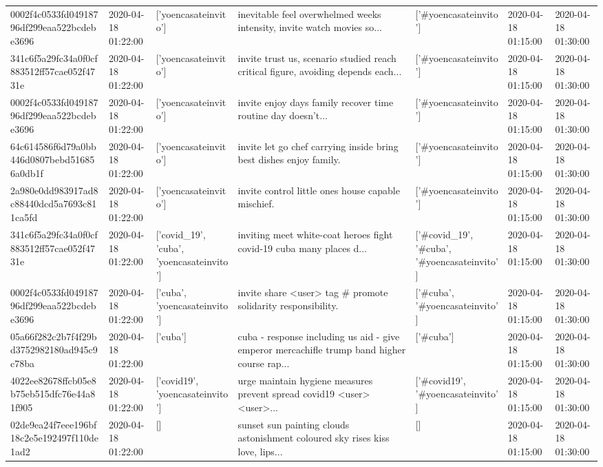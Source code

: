 \begin{tabular}{lllllll}
0002f4c0533fd04918796df299eaa522bcdebe3696 & 2020-04-18 01:22:00 & ['yoencasateinvito'] & inevitable feel overwhelmed weeks intensity, invite watch movies so... & ['#yoencasateinvito'] & 2020-04-18 01:15:00 & 2020-04-18 01:30:00 \\
341c6f5a29fc34a0f0cf883512ff57cae052f4731e & 2020-04-18 01:22:00 & ['yoencasateinvito'] & invite trust us, scenario studied reach critical figure, avoiding depends each... & ['#yoencasateinvito'] & 2020-04-18 01:15:00 & 2020-04-18 01:30:00 \\
0002f4c0533fd04918796df299eaa522bcdebe3696 & 2020-04-18 01:22:00 & ['yoencasateinvito'] & invite enjoy days family recover time routine day doesn't... & ['#yoencasateinvito'] & 2020-04-18 01:15:00 & 2020-04-18 01:30:00 \\
64c614586f6d79a0bb446d0807bebd516856a0db1f & 2020-04-18 01:22:00 & ['yoencasateinvito'] & invite let go chef carrying inside bring best dishes enjoy family. & ['#yoencasateinvito'] & 2020-04-18 01:15:00 & 2020-04-18 01:30:00 \\
2a980e0dd983917ad8c88440dcd5a7693c811ca5fd & 2020-04-18 01:22:00 & ['yoencasateinvito'] & invite control little ones house capable mischief. & ['#yoencasateinvito'] & 2020-04-18 01:15:00 & 2020-04-18 01:30:00 \\
341c6f5a29fc34a0f0cf883512ff57cae052f4731e & 2020-04-18 01:22:00 & ['covid_19', 'cuba', 'yoencasateinvito'] & inviting meet white-coat heroes fight covid-19 cuba many places d... & ['#covid_19', '#cuba', '#yoencasateinvito'] & 2020-04-18 01:15:00 & 2020-04-18 01:30:00 \\
0002f4c0533fd04918796df299eaa522bcdebe3696 & 2020-04-18 01:22:00 & ['cuba', 'yoencasateinvito'] & invite share <user> tag \# promote solidarity responsibility. & ['#cuba', '#yoencasateinvito'] & 2020-04-18 01:15:00 & 2020-04-18 01:30:00 \\
05a66f282c2b7f4f29bd3752982180ad945c9c78ba & 2020-04-18 01:22:00 & ['cuba'] & cuba - response including us aid - give emperor mercachifle trump band higher course rap... & ['#cuba'] & 2020-04-18 01:15:00 & 2020-04-18 01:30:00 \\
4022ee82678ffcb05e8b75eb515dfc76e44a81f905 & 2020-04-18 01:22:00 & ['covid19', 'yoencasateinvito'] & urge maintain hygiene measures prevent spread covid19 <user> <user>... & ['#covid19', '#yoencasateinvito'] & 2020-04-18 01:15:00 & 2020-04-18 01:30:00 \\
02de9ea24f7eee196bf18c2e5e192497f110de1ad2 & 2020-04-18 01:22:00 & [] & sunset sun painting clouds astonishment coloured sky rises kiss love, lips... & [] & 2020-04-18 01:15:00 & 2020-04-18 01:30:00 \\

\end{tabular}

